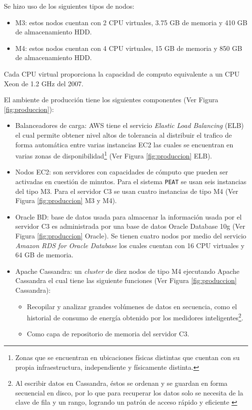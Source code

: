 
Se hizo uso de los siguientes tipos de nodos:
\begin{itemize}
\item M3: estos nodos cuentan con 2 CPU virtuales, 3.75 GB de memoria y
  410 GB de almacenamiento HDD.
\item M4: estos nodos cuentan con 4 CPU virtuales, 15 GB de memoria y
  850 GB de almacenamiento HDD.
\end{itemize}

Cada CPU virtual proporciona la capacidad de computo equivalente a un CPU
Xeon de 1.2 GHz del 2007.

\vspace{2.5mm}

El ambiente de producción tiene los siguientes componentes (Ver Figura \ref{fig:produccion}):
\begin{itemize}
\item Balanceadores de carga: AWS tiene el servicio \textit{Elastic Load Balancing}
  (ELB) el cual permite obtener nivel altos de tolerancia al distribuir el trafico
  de forma automática entre varias instancias EC2 las cuales se encuentran en
  varias zonas de disponibilidad\footnote{Zonas que se encuentran en
    ubicaciones físicas distintas que cuentan con su propia infraestructura,
    independiente y físicamente distinta.} (Ver Figura \ref{fig:produccion} ELB).
\item Nodos EC2: son servidores con capacidades de cómputo que pueden ser
  activadas en cuestión de minutos. Para el sistema \texttt{PEAT} se usan seis
  instancias del tipo M3. Para el servidor C3 se usan cuatro instancias de
  tipo M4 (Ver Figura \ref{fig:produccion} M3 y M4).
\item Oracle BD: base de datos usada para almacenar la información usada
  por el servidor C3 es administrada por una base de datos Oracle Database 10g
  (Ver Figura \ref{fig:produccion} Oracle). Se tienen cuatro nodos por medio del
  servicio \textit{Amazon RDS for Oracle Database} los cuales cuentan con
  16 CPU virtuales y 64 GB de memoria.
\item Apache Cassandra: un \textit{cluster} de diez nodos de tipo M4 ejecutando
  Apache Cassandra el cual tiene las siguiente funciones (Ver Figura
  \ref{fig:produccion} Cassandra):
  \begin{itemize}
  \item Recopilar y analizar grandes volúmenes de datos en secuencia, como el
    historial de consumo de energía obtenido por los medidores inteligentes\footnote{
      Al escribir datos en Cassandra, éstos se ordenan y se guardan en forma secuencial
      en disco, por lo que para recuperar los datos solo se necesita
      de la clave de fila y un rango, logrando un patrón de acceso rápido y eficiente
      \cite{33_time_series}}.
  \item Como capa de repositorio de memoria del servidor C3.
  \end{itemize}
\end{itemize}

